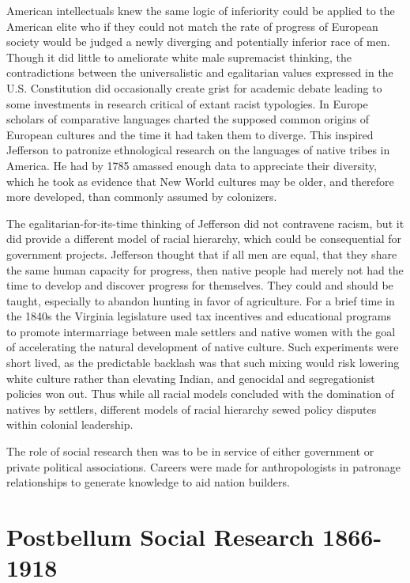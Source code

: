 \documentclass[]{book}
\begin{document}
American intellectuals knew the same logic of inferiority could be
applied to the American elite who if they could not match the rate of
progress of European society would be judged a newly diverging and
potentially inferior race of men. Though it did little to ameliorate
white male supremacist thinking, the contradictions between the
universalistic and egalitarian values expressed in the U.S. Constitution
did occasionally create grist for academic debate leading to some
investments in research critical of extant racist typologies. In Europe
scholars of comparative languages charted the supposed common origins of
European cultures and the time it had taken them to diverge. This
inspired Jefferson to patronize ethnological research on the languages
of native tribes in America. He had by 1785 amassed enough data to
appreciate their diversity, which he took as evidence that New World
cultures may be older, and therefore more developed, than commonly
assumed by colonizers.

The egalitarian-for-its-time thinking of Jefferson did not contravene
racism, but it did provide a different model of racial hierarchy, which
could be consequential for government projects. Jefferson thought that
if all men are equal, that they share the same human capacity for
progress, then native people had merely not had the time to develop and
discover progress for themselves. They could and should be taught,
especially to abandon hunting in favor of agriculture. For a brief time
in the 1840s the Virginia legislature used tax incentives and
educational programs to promote intermarriage between male settlers and
native women with the goal of accelerating the natural development of
native culture. \citep[9]{Patterson2001Social} Such experiments were
short lived, as the predictable backlash was that such mixing would risk
lowering white culture rather than elevating Indian, and genocidal and
segregationist policies won out. Thus while all racial models concluded
with the domination of natives by settlers, different models of racial
hierarchy sewed policy disputes within colonial leadership.

The role of social research then was to be in service of either
government or private political associations. Careers were made for
anthropologists in patronage relationships to generate knowledge to aid
nation builders.

\section{Postbellum Social Research
1866-1918}\label{postbellum-social-research-1866-1918}
\end{document}
